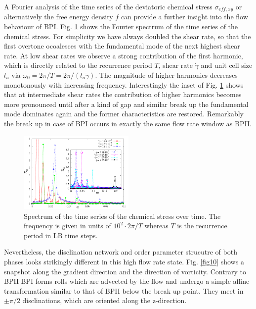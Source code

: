 \documentclass[aps,pre,twocolumn,groupedaddress]{revtex4-1}
\begin{document}
A Fourier analysis of the time series of the deviatoric chemical stress $\sigma_{eff,xy}$ or alternatively the free energy density $f$ can provide a further insight into the flow behaviour of BPI.
Fig. \ref{fig9} shows the Fourier spectrum of the time series of the chemical stress.
For simplicity we have always doubled the shear rate, so that the first overtone ocoalesces with the fundamental mode of the next highest shear rate. 
At low shear rates we observe a strong contribution of the first harmonic, which is directly related to the recurrence period $T$, shear rate $\dot{\gamma}$ and unit cell size $l_{u}$ via $\omega_0=2\pi/T=2\pi/(l_{u}\dot{\gamma})$.
The magnitude of higher harmonics decreases monotonously with increasing frequency.
Interestingly the inset of Fig. \ref{fig9} shows that at intermediate shear rates the contribution of higher harmonics becomes more pronounced until after a kind of gap and similar break up the fundamental mode dominates again and the former characteristics are restored.
Remarkably the break up in case of BPI occurs in exactly the same flow rate window as BPII.

\begin{figure}[h]
\includegraphics[width=0.5\textwidth]{spectrum_bp1.pdf}
\caption{Spectrum of the time series of the chemical stress over time. The frequency is given in units of $10^2\cdot 2\pi/T$ whereas $T$ is the recurrence period in LB time steps.}
\label{fig9}
\end{figure}

Nevertheless, the disclination network and order parameter strucutre of both phases looks strikingly different in this high flow rate state.
Fig. \ref{fig10} shows a snapshot along the gradient direction and the direction of vorticity.
Contrary to BPII BPI forms rolls which are advected by the flow and undergo a simple affine transformation similar to that of BPII below the break up point.
They meet in $\pm\pi/2$ disclinations, which are oriented along the z-direction.
\end{document}
